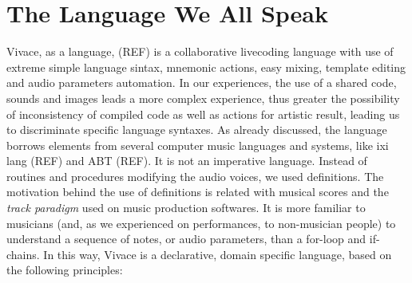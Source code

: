 \documentclass[letterpaper, 12pt]{article}
\begin{document}
\section{The Language We All Speak}
Vivace, as a language, (REF) is a collaborative livecoding  language with use of extreme simple language sintax, mnemonic actions, easy mixing, template editing and audio parameters automation. In our experiences, the use of a shared code, sounds and images leads a more complex experience,  thus greater the possibility of inconsistency of compiled code as well as actions for artistic result, leading us to discriminate specific language syntaxes.
As already discussed, the language borrows elements from several computer music languages and systems, like ixi lang (REF) and ABT (REF). It is not an imperative language. Instead of routines and procedures modifying the audio voices, we used definitions. The motivation behind the use of definitions is related with musical scores and the \emph{track paradigm} used on music production softwares. It is more familiar to musicians (and, as we experienced on performances, to non-musician people) to understand a sequence of notes, or audio parameters, than a for-loop and if-chains. In this way, Vivace is a declarative, domain specific language, based on the following principles:
\end{document}
